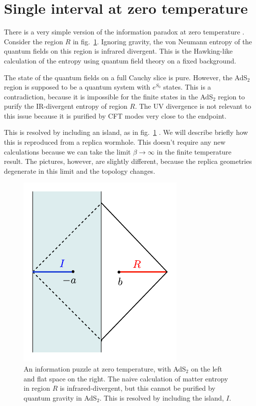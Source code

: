 

\section{Single interval at zero temperature}

There is a very simple version of the information paradox at zero temperature \cite{Almheiri:2019yqk}. Consider the region $R$ in fig.~\ref{fig:zerotemp-lorentzian}. Ignoring gravity, the von Neumann entropy of the quantum fields on this region is infrared divergent. This is the Hawking-like calculation of the entropy using quantum field theory on a fixed background.

The state of the quantum fields on a full Cauchy slice is pure. However, the AdS$_2$ region is supposed to be a quantum system with $e^{S_0}$ states. This is a contradiction, because it is impossible for the finite states in the AdS$_2$ region to purify the IR-divergent entropy of region $R$. The UV divergence is not relevant to this issue because it is purified by CFT modes very close to the endpoint.

This is resolved by including an island, as in fig.~\ref{fig:zerotemp-lorentzian} \cite{Almheiri:2019yqk}. We will describe briefly how this is reproduced from a replica wormhole. This doesn't require any new calculations because we can take the limit $\beta \to \infty$ in the finite temperature result.  The pictures, however, are slightly different, because the replica geometries degenerate in this limit and the topology changes.

\begin{figure}
\begin{center}
\includegraphics[scale=1.0]{figures/zerotemp-lorentzian.pdf}
\end{center}
\caption{\small An information puzzle at zero temperature, with AdS$_2$ on the left and flat space on the right. The naive calculation of matter entropy in region $R$ is infrared-divergent, but this cannot be purified by quantum gravity in AdS$_2$. This is resolved by including the island, $I$.}\label{fig:zerotemp-lorentzian}
\end{figure}

